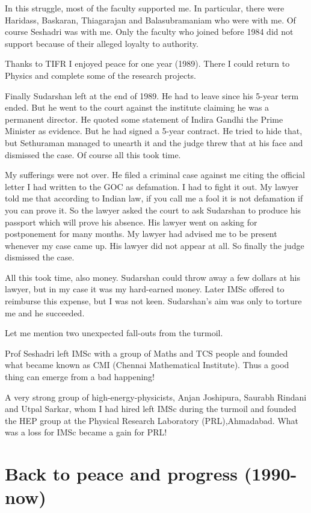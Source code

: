 In this struggle, most of the faculty supported me. In particular, there 
were Haridass, Baskaran, Thiagarajan and Balasubramaniam who were with 
me. Of course Seshadri was with me. Only the faculty who joined before 
1984 did not support because of their alleged loyalty to authority.

Thanks to TIFR I enjoyed peace for one year (1989). There I could return 
to Physics and complete some of the research projects.

Finally Sudarshan left at the end of 1989. He had to leave since his 
5-year term ended. But he went to the court against the institute 
claiming he was a permanent director. He quoted some statement of Indira 
Gandhi the Prime Minister as evidence. But he had signed a 5-year 
contract. He tried to hide that, but Sethuraman managed to unearth it 
and the judge threw that at his face and dismissed the case. Of course 
all this took time.

My sufferings were not over. He filed a criminal case against me citing 
the official letter I had written to the GOC as defamation. I had to 
fight it out. My lawyer told me that according to Indian law, if you 
call me a fool it is not defamation if you can prove it. So the 
lawyer asked the court to ask Sudarshan to produce his passport which 
will prove his absence. His lawyer went on asking for postponement for 
many months. My lawyer had advised me to be present whenever my case 
came up. His lawyer did not appear at all. So finally the judge 
dismissed the case.

All this took time, also money. Sudarshan could throw away a few dollars 
at his lawyer, but in my case it was my hard-earned money. Later IMSc 
offered to reimburse this expense, but I was not keen. Sudarshan's aim 
was only to torture me and he succeeded.

Let me mention two unexpected fall-outs from the turmoil.

Prof Seshadri left IMSc with a group of Maths and TCS people and founded 
what became known as CMI (Chennai Mathematical Institute). Thus a good 
thing can emerge from a bad happening!

A very strong group of high-energy-physicists, Anjan Joshipura, Saurabh 
Rindani and Utpal Sarkar, whom I had hired left IMSc during the turmoil 
and founded the HEP group at the Physical Research Laboratory 
(PRL),Ahmadabad. What was a loss for IMSc became a gain for PRL!

\section*{Back to peace and progress (1990-now)}

